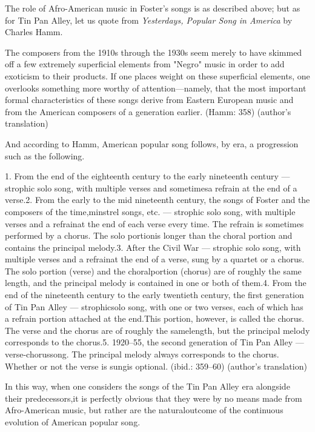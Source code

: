 The role of Afro-American music in Foster's songs is as described above; but as for Tin Pan Alley, let us quote from \textit{Yesterdays, Popular Song in America} by Charles Hamm.

\begin{gquote}
The composers from the 1910s through the 1930s seem merely to have skimmed off a few extremely superficial elements from "Negro" music in order to add exoticism to their products. If one places weight on these superficial elements, one overlooks something more worthy of attention—namely, that the most important formal characteristics of these songs derive from Eastern European music and from the American composers of a generation earlier. (Hamm: 358) (author's translation)
\end{gquote}

And according to Hamm, American popular song follows, by era, a progression such as the following.

\begin{gquote}
1. From the end of the eighteenth century to the early nineteenth century — strophic solo song, with multiple verses and sometimesa refrain at the end of a verse.2. From the early to the mid nineteenth century, the songs of Foster and the composers of the time,minstrel songs, etc. — strophic solo song, with multiple verses and a refrainat the end of each verse every time. The refrain is sometimes performed by a chorus. The solo portionis longer than the choral portion and contains the principal melody.3. After the Civil War — strophic solo song, with multiple verses and a refrainat the end of a verse, sung by a quartet or a chorus. The solo portion (verse) and the choralportion (chorus) are of roughly the same length, and the principal melody is contained in one or both of them.4. From the end of the nineteenth century to the early twentieth century, the first generation of Tin Pan Alley — strophicsolo song, with one or two verses, each of which has a refrain portion attached at the end.This portion, however, is called the chorus. The verse and the chorus are of roughly the samelength, but the principal melody corresponds to the chorus.5. 1920–55, the second generation of Tin Pan Alley — verse-chorussong. The principal melody always corresponds to the chorus. Whether or not the verse is sungis optional. (ibid.: 359–60) (author's translation)
\end{gquote}

In this way, when one considers the songs of the Tin Pan Alley era alongside their predecessors,it is perfectly obvious that they were by no means made from Afro-American music, but rather are the naturaloutcome of the continuous evolution of American popular song.


